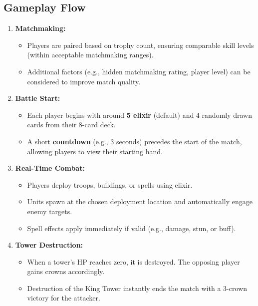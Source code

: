 \documentclass{article}
\begin{document}
\subsection{Gameplay Flow}
\begin{enumerate}[label=\arabic*.]
    \item \textbf{Matchmaking:}
    \begin{itemize}
        \item Players are paired based on trophy count, ensuring comparable skill levels (within acceptable matchmaking ranges).
        \item Additional factors (e.g., hidden matchmaking rating, player level) can be considered to improve match quality.
    \end{itemize}

    \item \textbf{Battle Start:}
    \begin{itemize}
        \item Each player begins with around \textbf{5 elixir} (default) and 4 randomly drawn cards from their 8-card deck.
        \item A short \textbf{countdown} (e.g., 3 seconds) precedes the start of the match, allowing players to view their starting hand.
    \end{itemize}

    \item \textbf{Real-Time Combat:}
    \begin{itemize}
        \item Players deploy troops, buildings, or spells using elixir. 
        \item Units spawn at the chosen deployment location and automatically engage enemy targets.
        \item Spell effects apply immediately if valid (e.g., damage, stun, or buff).
    \end{itemize}

    \item \textbf{Tower Destruction:}
    \begin{itemize}
        \item When a tower's HP reaches zero, it is destroyed. The opposing player gains crowns accordingly.
        \item Destruction of the King Tower instantly ends the match with a 3-crown victory for the attacker.
    \end{itemize}


\end{enumerate}
\end{document}
